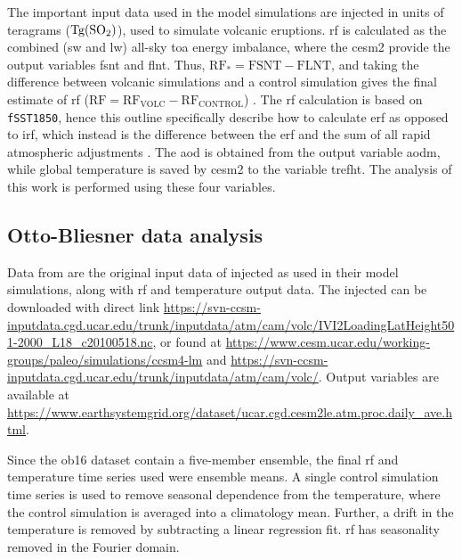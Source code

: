\documentclass{ametsocV6.1}
\newcommand{\iso}[1][i]{{#1}njected \ce{SO2}}
\begin{document}
The important input data used in the model simulations are \iso{} in units of teragrams
(\(\si{\tera\gram(\ce{SO2})}\)), used to simulate volcanic eruptions. \gls{rf} is
calculated as the combined (\gls{sw} and \gls{lw}) all-sky \gls{toa} energy imbalance,
where the \gls{cesm2} provide the output variables \gls{fsnt} and \gls{flnt}. Thus,
\(\mathrm{RF_*}= \mathrm{FSNT} - \mathrm{FLNT}\), and taking the difference between
volcanic simulations and a control simulation gives the final estimate of \gls{rf}
(\(\mathrm{RF}=\mathrm{RF_{VOLC}}-\mathrm{RF_{CONTROL}}\)) \citep{marshall2020}. The
\gls{rf} calculation is based on \texttt{fSST1850}, hence this outline specifically
describe how to calculate \gls{erf} as opposed to \gls{irf}, which instead is the
difference between the \gls{erf} and the sum of all rapid atmospheric adjustments
\citep{marshall2020,smith2018}. The \gls{aod} is obtained from the output variable
\gls{aodm}, while global temperature is saved by \gls{cesm2} to the variable
\gls{trefht}. The analysis of this work is performed using these four variables. 

\appendix[B]


\subsection{Otto-Bliesner data analysis}\label{ap:ob16}

Data from \citet{ottobliesner2016} are the original input data of \iso{} as used in
their model simulations, along with \gls{rf} and temperature output data. The \iso{} can
be downloaded with direct link
\url{https://svn-ccsm-inputdata.cgd.ucar.edu/trunk/inputdata/atm/cam/volc/IVI2LoadingLatHeight501-2000_L18_c20100518.nc},
or found at \url{https://www.cesm.ucar.edu/working-groups/paleo/simulations/ccsm4-lm}
and \url{https://svn-ccsm-inputdata.cgd.ucar.edu/trunk/inputdata/atm/cam/volc/}. Output
variables are available at
\url{https://www.earthsystemgrid.org/dataset/ucar.cgd.cesm2le.atm.proc.daily_ave.html}.

Since the \gls{ob16} dataset contain a five-member ensemble, the final \gls{rf} and
temperature time series used were ensemble means. A single control simulation time
series is used to remove seasonal dependence from the temperature, where the control
simulation is averaged into a climatology mean. Further, a drift in the temperature is
removed by subtracting a linear regression fit. \gls{rf} has seasonality removed in the
Fourier domain.
\end{document}
